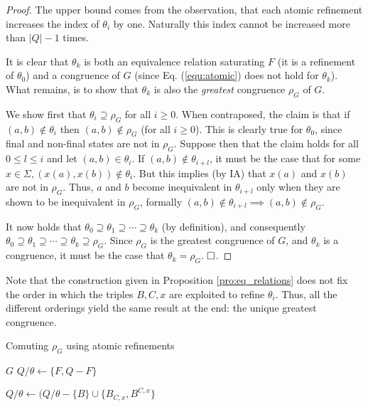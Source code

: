 \begin{proof}
	The upper bound comes from the observation, that each atomic refinement increases the index of $\theta_i$ by one. Naturally this index cannot be increased more than $|Q|-1$ times.
	
	It is clear that $\theta_k$ is both an equivalence relation saturating $F$ (it is a refinement of $\theta_0$) and a congruence of $G$ (since Eq. (\ref{equ:atomic}) does not hold for $\theta_k$). What remains, is to show that $\theta_k$ is also the \textit{greatest} congruence $\rho_G$ of $G$.
	
	We show first that $\theta_i\supseteq\rho_G$ for all $i\ge 0$. When contraposed, the claim is that if $(a,b)\notin\theta_i$ then $(a,b)\notin\rho_G$ (for all $i\ge 0$). This is clearly true for $\theta_0$, since final and non-final states are not in $\rho_G$. Suppose then that the claim holds for all $0\le l\le i$ and let $(a,b)\in\theta_i$. If $(a,b)\notin\theta_{i+l}$, it must be the case that for some $x\in\Sigma,(x(a),x(b))\notin\theta_i $. 
	But this implies (by IA) that $x(a)$ and $x(b)$ are not in $\rho_G$. Thus, $a$ and $b$ become inequivalent in $\theta_{i+l}$ only when they are shown to be inequivalent in $\rho_G$, formally $(a,b)\notin\theta_{i+l}\implies (a,b)\notin\rho_G$. 
	
	It now holds that $\theta_0\supseteq\theta_1\supseteq\cdots\supseteq\theta_k$ (by definition), and consequently $\theta_0\supseteq\theta_1\supseteq\cdots\supseteq\theta_k\supseteq\rho_G$. Since $\rho_G$ is the greatest congruence of $G$, and $\theta_k$ is a congruence, it must be the case that $\theta_k=\rho_G$.  $\hfill\square$.
\end{proof}

Note that the construction given in Proposition \ref{pro:eq_relations} does not fix the order in which the triples $B, C, x$ are exploited to refine $\theta_i$. Thus, all the different orderings yield the same result at the end: the unique greatest congruence.

\begin{algorithm}  
	\caption{Comuting $\rho_G$ using atomic refinements}  \label{alg:atomic}
	\begin{algorithmic}[1] %
		 {$G$}
		\State $Q/\theta\gets \{F,Q-F\}$
		
		\State $Q/\theta\gets(Q/\theta-\{B\}\cup\{B_{C,x},B^{C,x}  \}$
		\EndWhile
		
		\State \Return{$\theta$}  
		\EndFunction 
	\end{algorithmic}
\end{algorithm}

